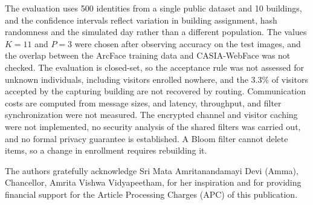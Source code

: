 \documentclass[pdflatex,sn-mathphys-num]{sn-jnl}%
\theoremstyle{thmstyleone}%
\theoremstyle{thmstyletwo}%
\theoremstyle{thmstylethree}%
\begin{document}
The evaluation uses 500 identities from a single public dataset and 10 buildings, and the confidence intervals reflect variation in building assignment, hash randomness and the simulated day rather than a different population. The values $K=11$ and $P=3$ were chosen after observing accuracy on the test images, and the overlap between the ArcFace training data and CASIA-WebFace was not checked. The evaluation is closed-set, so the acceptance rule was not assessed for unknown individuals, including visitors enrolled nowhere, and the 3.3\% of visitors accepted by the capturing building are not recovered by routing. Communication costs are computed from message sizes, and latency, throughput, and filter synchronization were not measured. The encrypted channel and visitor caching were not implemented, no security analysis of the shared filters was carried out, and no formal privacy guarantee is established. A Bloom filter cannot delete items, so a change in enrollment requires rebuilding it.


The authors gratefully acknowledge Sri Mata Amritanandamayi Devi (Amma), Chancellor, Amrita Vishwa Vidyapeetham, for her inspiration and for providing financial support for the Article Processing Charges (APC) of this publication.

\end{document}
